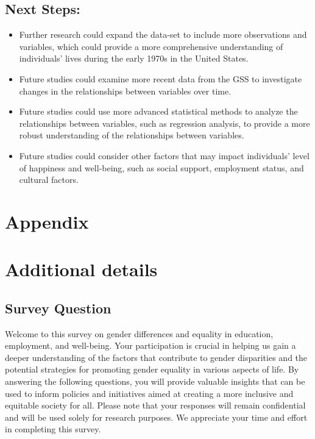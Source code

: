 \documentclass[
  letterpaper,
  DIV=11,
  numbers=noendperiod]{scrartcl}
\providecommand{\tightlist}{%
  \setlength{\itemsep}{0pt}\setlength{\parskip}{0pt}}\usepackage{longtable,booktabs,array}
\begin{document}
\hypertarget{next-steps}{%
\subsection{Next Steps:}\label{next-steps}}

\begin{itemize}
\tightlist
\item
  Further research could expand the data-set to include more
  observations and variables, which could provide a more comprehensive
  understanding of individuals' lives during the early 1970s in the
  United States.
\item
  Future studies could examine more recent data from the GSS to
  investigate changes in the relationships between variables over time.
\item
  Future studies could use more advanced statistical methods to analyze
  the relationships between variables, such as regression analysis, to
  provide a more robust understanding of the relationships between
  variables.
\item
  Future studies could consider other factors that may impact
  individuals' level of happiness and well-being, such as social
  support, employment status, and cultural factors.
\end{itemize}

\newpage

\appendix

\hypertarget{appendix}{%
\section*{Appendix}\label{appendix}}

\hypertarget{additional-details}{%
\section{Additional details}\label{additional-details}}

\hypertarget{survey-question}{%
\subsection{Survey Question}\label{survey-question}}

Welcome to this survey on gender differences and equality in education,
employment, and well-being. Your participation is crucial in helping us
gain a deeper understanding of the factors that contribute to gender
disparities and the potential strategies for promoting gender equality
in various aspects of life. By answering the following questions, you
will provide valuable insights that can be used to inform policies and
initiatives aimed at creating a more inclusive and equitable society for
all. Please note that your responses will remain confidential and will
be used solely for research purposes. We appreciate your time and effort
in completing this survey.
\end{document}
